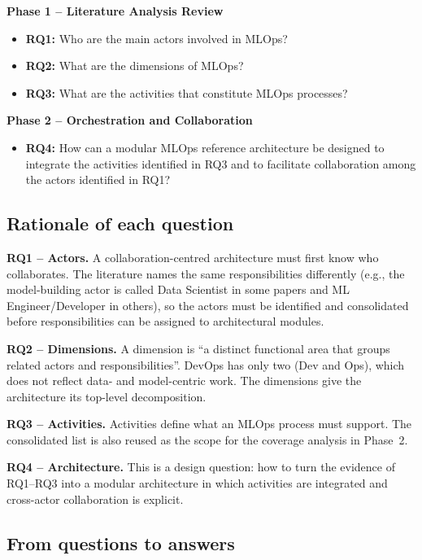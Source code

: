 \documentclass[11pt,a4paper]{article}
\begin{document}
\begin{callout}
\textbf{Phase 1 -- Literature Analysis Review}
\begin{itemize}
  \item \textbf{RQ1:} Who are the main actors involved in MLOps?
  \item \textbf{RQ2:} What are the dimensions of MLOps?
  \item \textbf{RQ3:} What are the activities that constitute MLOps processes?
\end{itemize}
\textbf{Phase 2 -- Orchestration and Collaboration}
\begin{itemize}
  \item \textbf{RQ4:} How can a modular MLOps reference architecture be designed to integrate the activities identified in RQ3 and to facilitate collaboration among the actors identified in RQ1?
\end{itemize}
\end{callout}

\subsection{Rationale of each question}

\textbf{RQ1 -- Actors.}
A collaboration-centred architecture must first know who collaborates. The literature names the same responsibilities differently (e.g., the model-building actor is called Data Scientist in some papers and ML Engineer/Developer in others), so the actors must be identified and consolidated before responsibilities can be assigned to architectural modules.

\textbf{RQ2 -- Dimensions.}
A dimension is ``a distinct functional area that groups related actors and responsibilities''. DevOps has only two (Dev and Ops), which does not reflect data- and model-centric work. The dimensions give the architecture its top-level decomposition.

\textbf{RQ3 -- Activities.}
Activities define what an MLOps process must support. The consolidated list is also reused as the scope for the coverage analysis in Phase~2.

\textbf{RQ4 -- Architecture.}
This is a design question: how to turn the evidence of RQ1--RQ3 into a modular architecture in which activities are integrated and cross-actor collaboration is explicit.

\subsection{From questions to answers}
\end{document}
